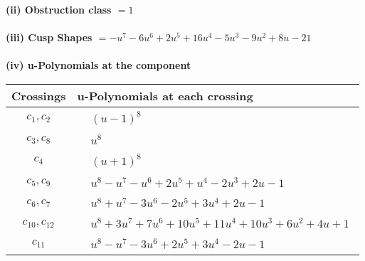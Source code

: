 \documentclass[1p]{elsarticle_modified}
\theoremstyle{definition}
\begin{document}
\flushleft \textbf{(ii) Obstruction class $= 1$}\\~\\
\flushleft \textbf{(iii) Cusp Shapes $= - u^7-6 u^6+2 u^5+16 u^4-5 u^3-9 u^2+8 u-21$}\\~\\
\newpage\renewcommand{\arraystretch}{1}
\flushleft \textbf{(iv) u-Polynomials at the component}\newline \\
\begin{tabular}{m{50pt}|m{274pt}}
Crossings & \hspace{64pt}u-Polynomials at each crossing \\
\hline $$\begin{aligned}c_{1},c_{2}\end{aligned}$$&$\begin{aligned}
&(u-1)^8
\end{aligned}$\\
\hline $$\begin{aligned}c_{3},c_{8}\end{aligned}$$&$\begin{aligned}
&u^8
\end{aligned}$\\
\hline $$\begin{aligned}c_{4}\end{aligned}$$&$\begin{aligned}
&(u+1)^8
\end{aligned}$\\
\hline $$\begin{aligned}c_{5},c_{9}\end{aligned}$$&$\begin{aligned}
&u^8- u^7- u^6+2 u^5+u^4-2 u^3+2 u-1
\end{aligned}$\\
\hline $$\begin{aligned}c_{6},c_{7}\end{aligned}$$&$\begin{aligned}
&u^8+u^7-3 u^6-2 u^5+3 u^4+2 u-1
\end{aligned}$\\
\hline $$\begin{aligned}c_{10},c_{12}\end{aligned}$$&$\begin{aligned}
&u^8+3 u^7+7 u^6+10 u^5+11 u^4+10 u^3+6 u^2+4 u+1
\end{aligned}$\\
\hline $$\begin{aligned}c_{11}\end{aligned}$$&$\begin{aligned}
&u^8- u^7-3 u^6+2 u^5+3 u^4-2 u-1
\end{aligned}$\\
\hline
\end{tabular}\\~\\
\end{document}
